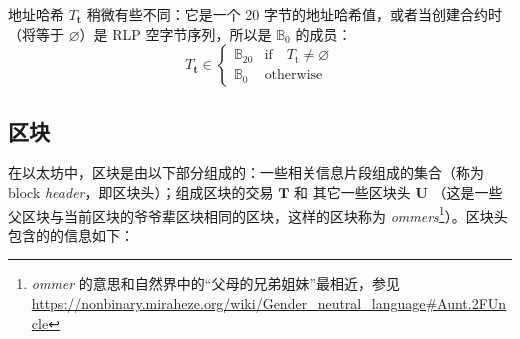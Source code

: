 \documentclass[9pt,oneside]{amsart}
\makeatletter
\newcommand{\linkdest}[1]{\Hy@raisedlink{\hypertarget{#1}{}}}
\makeatother
\begin{document}
\begin{multicols}{2}
地址哈希 $T_{\mathbf{t}}$ 稍微有些不同：它是一个 20 字节的地址哈希值，或者当创建合约时（将等于 $\varnothing$）是 RLP 空字节序列，所以是 $\mathbb{B}_0$ 的成员：
\begin{equation}
T_{\mathbf{t}} \in \begin{cases} \mathbb{B}_{20} & \text{if} \quad T_{\mathrm{t}} \neq \varnothing \\
\mathbb{B}_{0} & \text{otherwise}\end{cases}
\end{equation}

\subsection{区块}\linkdest{block}\label{subsec:The_Block}

在以太坊中，区块是由以下部分组成的：一些相关信息片段组成的集合（称为 block \textit{header}，即区块头）；组成区块的交易 $\mathbf{T}$ 和 \hypertarget{ommerheaders}{}其它一些区块头 $\mathbf{U}$ （这是一些父区块与当前区块的爷爷辈区块相同的区块，这样的区块称为 \textit{ommers}\footnote{\textit{ommer} 的意思和自然界中的“父母的兄弟姐妹”最相近，参见 \url{https://nonbinary.miraheze.org/wiki/Gender_neutral_language\#Aunt.2FUncle}}）。区块头包含的的信息如下：



\end{multicols}
\end{document}
